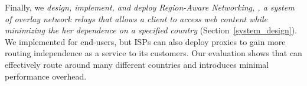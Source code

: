 Finally, we {\em design, implement, and deploy Region-Aware Networking, \system{}, a system of overlay network relays that allows
a client to access web content while minimizing the her dependence on a specified
country} (Section~\ref{system_design}).  We implemented \system{} for end-users, 
but ISPs can also deploy \system{} proxies to gain more routing independence as a service 
to its customers.  Our evaluation shows that \system{} can effectively route around many different countries and
introduces minimal performance overhead.
